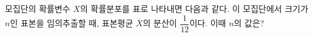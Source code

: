 모집단의 확률변수 $X$의 확률분포를 표로 나타내면 다음과 같다. 이 모집단에서 크기가 $n$인 표본을 임의추출할 때, 표본평균 $\overline{X}$의 분산이 $\dfrac{1}{12}$이다. 이때 $n$의 값은?
\par\smallskip\begin{center}\resizebox{\ifdim\width>\linewidth\linewidth\else\width\fi}{!}{}\end{center}
